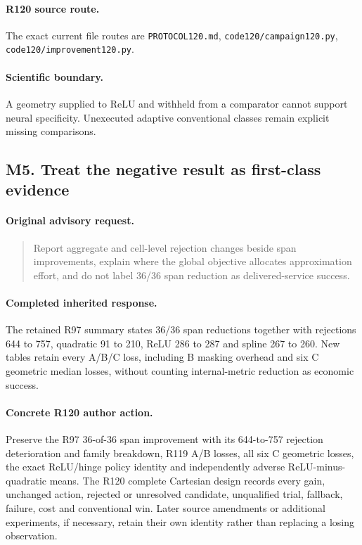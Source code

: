\paragraph{R120 source route.}
The exact current file routes are \nolinkurl{PROTOCOL120.md}, \nolinkurl{code120/campaign120.py}, \nolinkurl{code120/improvement120.py}.
\paragraph{Scientific boundary.}
A geometry supplied to ReLU and withheld from a comparator cannot support neural specificity. Unexecuted adaptive conventional classes remain explicit missing comparisons.

\subsection{M5. Treat the negative result as first-class evidence}
\label{response120:M5}
\paragraph{Original advisory request.}
\begin{quote}
Report aggregate and cell-level rejection changes beside span improvements, explain where the global objective allocates approximation effort, and do not label 36/36 span reduction as delivered-service success.
\end{quote}
\paragraph{Completed inherited response.}
The retained R97 summary states 36/36 span reductions together with rejections 644 to 757, quadratic 91 to 210, ReLU 286 to 287 and spline 267 to 260. New tables retain every A/B/C loss, including B masking overhead and six C geometric median losses, without counting internal-metric reduction as economic success.
\paragraph{Concrete R120 author action.}
Preserve the R97 36-of-36 span improvement with its 644-to-757 rejection deterioration and family breakdown, R119 A/B losses, all six C geometric losses, the exact ReLU/hinge policy identity and independently adverse ReLU-minus-quadratic means. The R120 complete Cartesian design records every gain, unchanged action, rejected or unresolved candidate, unqualified trial, fallback, failure, cost and conventional win. Later source amendments or additional experiments, if necessary, retain their own identity rather than replacing a losing observation.
